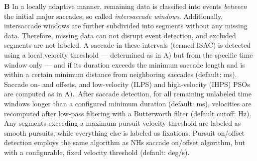 \begin{enumerate}
 \textbf{B} In a locally adaptive manner, remaining data is classified into events \textit{between} the initial major saccades, so called \textit{intersaccade windows}. Additionally, intersaccade windows are further subdivided into segments without any missing data. Therefore, missing data can not disrupt event detection, and excluded segments are not labeled. A saccade in these intervals (termed ISAC) is detected using a local velocity threshold --- determined as in A) but from the specific time window only --- and if its duration exceeds the minimum saccade length and is within a certain minimum distance from neighboring saccades (default: \unit[130]{ms}). Saccade on- and offsets, and low-velocity (ILPS) and high-velocity (IHPS) PSOs are computed as in A).\
 After saccade detection, for all remaining unlabeled time windows longer than a configured minimum duration (default: \unit[40]{ms}), velocities are recomputed after low-pass filtering with a Butterworth filter (default cutoff: \unit[4]{Hz}). Any segments exceeding a maximum pursuit velocity threshold are labeled as smooth pursuits, while everything else is labeled as fixations. Pursuit on/offset detection employs the same algorithm as NHs saccade on/offset algorithm, but with a configurable, fixed velocity threshold (default: \unit[2]{deg/s}).
   
\end{enumerate}



